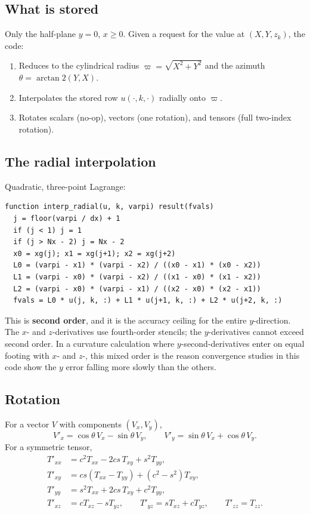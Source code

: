 \documentclass[11pt,openany]{book}
\begin{document}
\subsection{What is stored}

Only the half-plane $y = 0$, $x \geq 0$. Given a request for the value at
$(X, Y, z_k)$, the code:
\begin{enumerate}
\item Reduces to the cylindrical radius
      $\varpi = \sqrt{X^2 + Y^2}$ and the azimuth
      $\theta = \arctan2(Y, X)$.
\item Interpolates the stored row $u(\cdot, k, \cdot)$ radially onto $\varpi$.
\item Rotates scalars (no-op), vectors (one rotation), and tensors (full
      two-index rotation).
\end{enumerate}

\subsection{The radial interpolation}

Quadratic, three-point Lagrange:
\begin{lstlisting}
function interp_radial(u, k, varpi) result(fvals)
  j = floor(varpi / dx) + 1
  if (j < 1) j = 1
  if (j > Nx - 2) j = Nx - 2
  x0 = xg(j); x1 = xg(j+1); x2 = xg(j+2)
  L0 = (varpi - x1) * (varpi - x2) / ((x0 - x1) * (x0 - x2))
  L1 = (varpi - x0) * (varpi - x2) / ((x1 - x0) * (x1 - x2))
  L2 = (varpi - x0) * (varpi - x1) / ((x2 - x0) * (x2 - x1))
  fvals = L0 * u(j, k, :) + L1 * u(j+1, k, :) + L2 * u(j+2, k, :)
\end{lstlisting}

\gotcha
This is \textbf{second order}, and it is the accuracy ceiling for the entire
$y$-direction. The $x$- and $z$-derivatives use fourth-order stencils; the
$y$-derivatives cannot exceed second order. In a curvature calculation where
$y$-second-derivatives enter on equal footing with $x$- and $z$-, this mixed
order is the reason convergence studies in this code show the $y$ error
falling more slowly than the others.

\label{sec:cartoon}
\subsection{Rotation}

For a vector $V$ with components $(V_x, V_y)$,
\begin{equation}
V'_x = \cos\theta\, V_x - \sin\theta\, V_y,\qquad
V'_y = \sin\theta\, V_x + \cos\theta\, V_y.
\end{equation}
For a symmetric tensor,
\begin{align}
T'_{xx} &= c^2T_{xx} - 2cs\,T_{xy} + s^2T_{yy}, \\
T'_{xy} &= cs(T_{xx}-T_{yy}) + (c^2-s^2)T_{xy}, \\
T'_{yy} &= s^2T_{xx} + 2cs\,T_{xy} + c^2T_{yy}, \\
T'_{xz} &= cT_{xz} - sT_{yz},\qquad
T'_{yz} = sT_{xz} + cT_{yz},\qquad T'_{zz} = T_{zz}.
\end{align}
\end{document}
